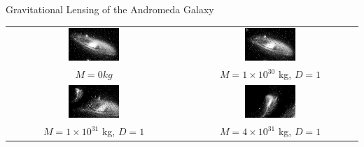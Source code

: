 \documentclass[aspectratio=1610,xcolor=dvipsnames,t]{beamer}
\begin{document}
\begin{frame}{Gravitational Lensing of the Andromeda Galaxy} 
\begin{center}
    \begin{tabular}{cc} 
    \includegraphics[width=0.3\textwidth]{pics/andromeda.eps}  &
    \includegraphics[width=0.3\textwidth]{pics/1e30and.eps}  \\
    $M = 0 kg$ & $M = 1 \times 10^{30}$ kg, $D = 1$ \\ 
    \includegraphics[width=0.3\textwidth]{pics/1e31and.eps}  &
    \includegraphics[width=0.3\textwidth]{pics/4e31and.eps} \\
    $M = 1 \times 10^{31}$ kg, $D = 1$ &  $M = 4 \times 10^{31}$ kg, $D = 1$ \\ 
    \end{tabular} 
\end{center}
\end{frame}


\end{document}
